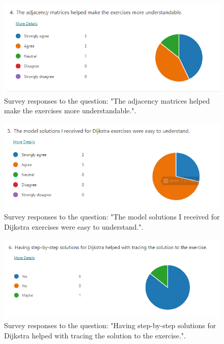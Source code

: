 \documentclass{l4proj}
\begin{document}
\begin{appendices}
\begin{figure}[h]
    \centering
    \includegraphics[width=0.9\linewidth]{images/adjacency_matrix.png}    

    \caption{Survey responses to the question: "The adjacency matrices helped make the exercises more understandable.".}
    \label{fig:adjacency_matrix} 
\end{figure}

\begin{figure}[h]
    \centering
    \includegraphics[width=0.9\linewidth]{images/d_model_solution.png}    

    \caption{Survey responses to the question: "The model solutions I received for Dijkstra exercises were easy to understand.".}
    \label{fig:d_model_solution} 
\end{figure}

\begin{figure}[h]
    \centering
    \includegraphics[width=0.9\linewidth]{images/d_step_by_step.png}    

    \caption{Survey responses to the question: "Having step-by-step solutions for Dijkstra helped with tracing the solution to the exercise.".}
    \label{fig:d_step_by_step} 
\end{figure}


\end{appendices}
\end{document}
